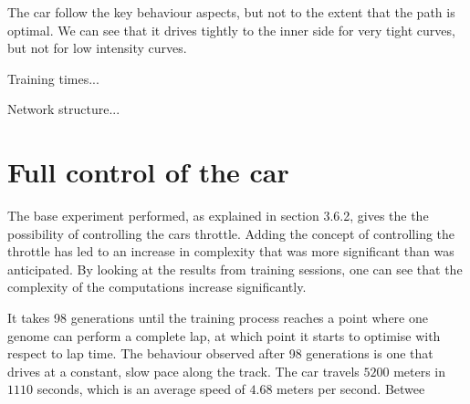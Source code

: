 The car follow the key behaviour aspects, but not to the extent that the path is optimal. We can see that it drives tightly to the inner side for very tight curves, but not for low intensity curves.

Training times...

Network structure...





\section{Full control of the car}


The base experiment performed, as explained in section 3.6.2, gives the the possibility of controlling the cars throttle. Adding the concept of controlling the throttle has led to an increase in complexity that was more significant than was anticipated. By looking at the results from training sessions, one can see that the complexity of the computations increase significantly.

It takes 98 generations until the training process reaches a point where one genome can perform a complete lap, at which point it starts to optimise with respect to lap time. The behaviour observed after 98 generations is one that drives at a constant, slow pace along the track. The car travels $5200$ meters in $1110$ seconds, which is an average speed of $4.68$ meters per second. Betwee

